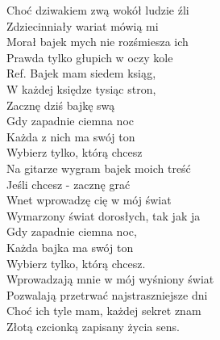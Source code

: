 
\begin{flushleft}
Choć dziwakiem zwą wokół ludzie źli \\
Zdziecinniały wariat mówią mi \\
Morał bajek mych nie rozśmiesza ich \\
Prawda tylko głupich w oczy kole \\
\vskip 3mm
Ref. Bajek mam siedem ksiąg,\tab{} \\
\hspace{0.9cm}W każdej księdze tysiąc stron,  \\
\hspace{0.9cm}Zacznę dziś bajkę swą \tab{}\\
\hspace{0.9cm}Gdy zapadnie ciemna noc \\
\hspace{0.9cm}Każda z nich ma swój ton \\
\hspace{0.9cm}Wybierz tylko, którą chcesz \\
\hspace{0.9cm}Na gitarze wygram bajek moich treść \\
\hspace{0.9cm}Jeśli chcesz - zacznę grać \tab{}\\
\hspace{0.9cm}Wnet wprowadzę cię w mój świat \\
\hspace{0.9cm}Wymarzony świat dorosłych, tak jak ja  \\
\hspace{0.9cm}Gdy zapadnie ciemna noc, \\
\hspace{0.9cm}Każda bajka ma swój ton \\
\hspace{0.9cm}Wybierz tylko, którą chcesz. \\
\vskip 3mm
Wprowadzają mnie w mój wyśniony świat \\
Pozwalają przetrwać najstraszniejsze dni \\
Choć ich tyle mam, każdej sekret znam \\
Złotą czcionką zapisany życia sens. \\

\end{flushleft}
